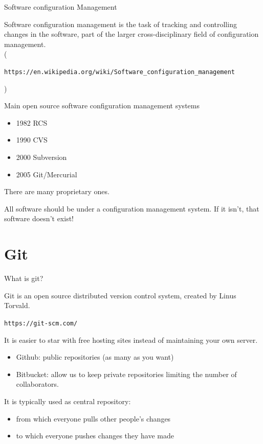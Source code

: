 \documentclass{beamer}
\begin{document}
\begin{frame}[plain]{Software configuration Management}


Software configuration management is the task of tracking and controlling changes in the software, part of the larger cross-disciplinary field of configuration management.\\
(\begin{scriptsize}\texttt{https://en.wikipedia.org/wiki/Software\_configuration\_management}                                                                                         \end{scriptsize})

Main open source software configuration management systems
\begin{itemize}
 \item 1982 RCS
 \item 1990 CVS
 \item 2000 Subversion
 \item 2005 Git/Mercurial
\end{itemize}

There are many proprietary ones. 

All software should be under a configuration management system. If it isn't, that software doesn't exist!

\end{frame}

\section{Git}

\begin{frame}{What is git?}

Git is an open source distributed version control system, created by Linus Torvald.

\texttt{https://git-scm.com/}

It is easier to star with free hosting sites instead of maintaining your own server.

\begin{itemize}
 \item Github: public repositories (as many as you want)
 \item Bitbucket: allow us to keep private repositories limiting the number of collaborators.
\end{itemize}

It is typically used as central repository:
\begin{itemize}
 \item from which everyone pulls other people’s changes
 \item to which everyone pushes changes they have made
\end{itemize}


\end{frame}
\end{document}
